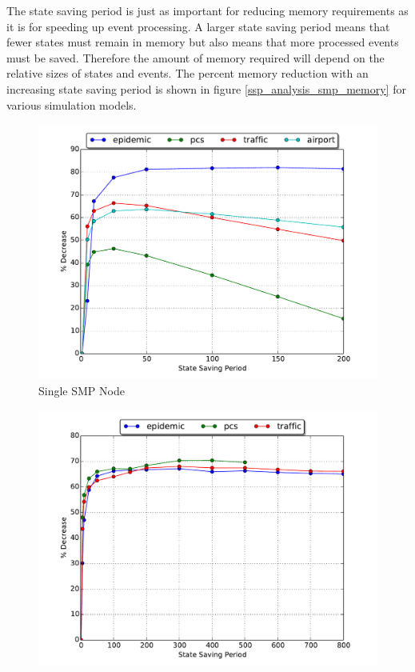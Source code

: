 \documentclass[11pt]{book}
\begin{document}
The state saving period is just as important for reducing memory requirements as it is for
speeding up event processing. A larger state saving period means that fewer states must remain
in memory but also means that more processed events must be saved. Therefore the amount of
memory required will depend on the relative sizes of states and events. The percent memory
reduction with an increasing state saving period is shown in figure \ref{ssp_analysis_smp_memory}
for various simulation models.

\begin{figure}
  \begin{minipage}{.5\textwidth}
    \begin{center}
      \includegraphics[width=\textwidth,keepaspectratio,quiet]{figs/state_saving/bc/percent_memory_decrease.pdf} \\
      Single SMP Node \\
    \end{center}
  \end{minipage}%
  \hfill
  \begin{minipage}{.5\textwidth}
    \begin{center}
      \includegraphics[width=\textwidth,keepaspectratio,quiet]{figs/state_saving/beowulf/percent_memory_decrease.pdf} \\

\end{center}
\end{minipage}
\end{figure}
\end{document}
